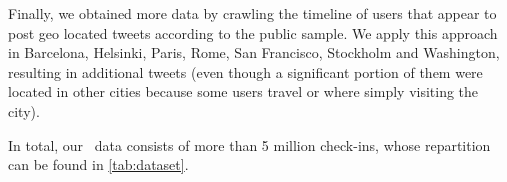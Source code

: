 Finally, we obtained more data by crawling the timeline of users that appear to
post geo located tweets according to the public sample. We apply this approach
in Barcelona, Helsinki, Paris, Rome, San Francisco, Stockholm and Washington,
resulting in  additional tweets (even though a significant
portion of them were located in other cities because some users travel or where
simply visiting the city).

In total, our \fs\ data consists of more than 5 million check-ins, whose
repartition can be found in \autoref{tab:dataset}.


\begin{table}[ht]
  \small
  \setlength{\tabcolsep}{5pt}
	\centering
	

\end{table}
